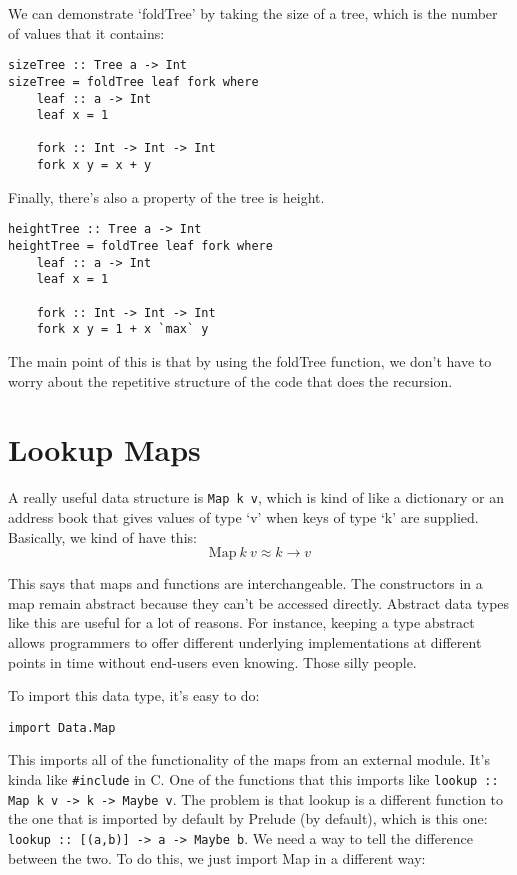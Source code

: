 \documentclass[11pt,a4paper,titlepage]{scrartcl}
\begin{document}
We can demonstrate `foldTree' by taking the size of a tree, which is the
number of values that it contains:

\begin{lstlisting}
sizeTree :: Tree a -> Int
sizeTree = foldTree leaf fork where
    leaf :: a -> Int
    leaf x = 1

    fork :: Int -> Int -> Int
    fork x y = x + y
\end{lstlisting}

Finally, there's also a property of the tree is height.
\begin{lstlisting}
heightTree :: Tree a -> Int
heightTree = foldTree leaf fork where
    leaf :: a -> Int
    leaf x = 1

    fork :: Int -> Int -> Int
    fork x y = 1 + x `max` y
\end{lstlisting}

The main point of this is that by using the foldTree function, we don't
have to worry about the repetitive structure of the code that does the
recursion.

\section{Lookup Maps}%
\label{sec:maps}
A really useful data structure is \lstinline|Map k v|, which is kind of
like a dictionary or an address book that gives values of type `v' when
keys of type `k' are supplied. Basically, we kind of have this:
\begin{equation*}
    \text{Map} \ k \ v \approx k \rightarrow v
\end{equation*}

This says that maps and functions are interchangeable. The constructors in
a map remain abstract because they can't be accessed directly. Abstract
data types like this are useful for a lot of reasons. For instance,
keeping a type abstract allows programmers to offer different underlying
implementations at different points in time without end-users even
knowing. Those silly people.

To import this data type, it's easy to do:
\begin{lstlisting}
import Data.Map
\end{lstlisting}

This imports all of the functionality of the maps from an external module.
It's kinda like \lstinline|#include| in C. One of the functions that this
imports like \lstinline|lookup :: Map k v -> k -> Maybe v|. The problem is
that lookup is a different function to the one that is imported by default
by Prelude (by default), which is this one:
\lstinline|lookup :: [(a,b)] -> a -> Maybe b|. We need a way to tell the
difference between the two. To do this, we just import Map in a different
way:
\end{document}

